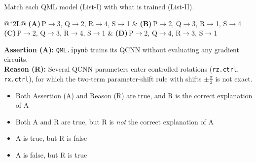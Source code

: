 \documentclass[11pt,a4paper]{article}
\newcommand{\optlabel}[1]{\textbf{(#1)}}
\newenvironment{qitem}[1]{\begin{list}{}{\setlength{\leftmargin}{3.3em}\setlength{\labelwidth}{3.1em}%
  \setlength{\labelsep}{0.2em}\setlength{\topsep}{3pt}\setlength{\parsep}{3pt}}\item[\textbf{Q.#1}\hfill]}{\end{list}}
\newcommand{\qsep}{\par\vspace{2pt}{\color{black!15}\hrule}\vspace{4pt}}
\begin{document}
\begin{qitem}{56}
Match each QML model (List-I) with what is trained (List-II).
\par\smallskip{}
\par\smallskip\noindent\begin{tabularx}{\linewidth}{@{}*{2}{L}@{}}
\optlabel{A}\,P$\to$3, Q$\to$2, R$\to$4, S$\to$1 & \optlabel{B}\,P$\to$2, Q$\to$3, R$\to$1, S$\to$4 \\[3pt]
\optlabel{C}\,P$\to$2, Q$\to$3, R$\to$4, S$\to$1 & \optlabel{D}\,P$\to$2, Q$\to$4, R$\to$3, S$\to$1
\end{tabularx}
\end{qitem}
\qsep

\begin{qitem}{57}
\textbf{Assertion (A):} \texttt{QML.ipynb} trains its QCNN without evaluating any gradient circuits.\\[1mm]
\textbf{Reason (R):} Several QCNN parameters enter controlled rotations (\texttt{rz.ctrl}, \texttt{rx.ctrl}), for which the two-term
parameter-shift rule with shifts $\pm\frac\pi2$ is not exact.
\begin{itemize}[leftmargin=2.6em, labelsep=0.4em, itemsep=2pt, topsep=3pt]
\item[\optlabel{A}] Both Assertion (A) and Reason (R) are true, and R is the correct explanation of A
\item[\optlabel{B}] Both A and R are true, but R is \emph{not} the correct explanation of A
\item[\optlabel{C}] A is true, but R is false
\item[\optlabel{D}] A is false, but R is true
\end{itemize}
\end{qitem}
\qsep
\end{document}
